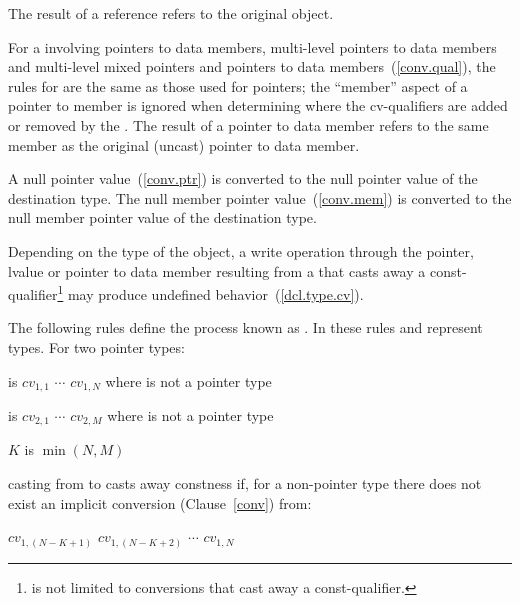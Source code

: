 The result of a reference  refers
to the original object.

\pnum
For a  involving pointers to data members, multi-level
pointers to data members and multi-level mixed pointers and pointers to
data members~(\ref{conv.qual}), the rules for  are the
same as those used for pointers; the ``member'' aspect of a pointer to
member is ignored when determining where the cv-qualifiers are added or
removed by the . The result of a pointer to data
member  refers to the same member as the original
(uncast) pointer to data member.

\pnum
A null pointer value~(\ref{conv.ptr}) is converted to the null pointer
value of the destination type. The null member pointer
value~(\ref{conv.mem}) is converted to the null member pointer value of
the destination type.

\pnum
\enternote 
Depending on the type of the object, a write operation through the
pointer, lvalue or pointer to data member resulting from a
 that casts away a const-qualifier\footnote{
is not limited to conversions that cast away a
const-qualifier.}
may produce undefined behavior~(\ref{dcl.type.cv}).
\exitnote 

\pnum
The following rules define the process known as . In these rules  and 
represent types. For two pointer types:

\begin{indented}
 is $\mathit{cv}_{1,1}$ \tcode{*} $\cdots$
$\mathit{cv}_{1,N}$ \tcode{*} where  is not a pointer type
\end{indented}

\begin{indented}
 is $\mathit{cv}_{2,1}$ \tcode{*} $\cdots$
$\mathit{cv}_{2,M}$ \tcode{*} where  is not a pointer type
\end{indented}

\begin{indented}
$K$ is $\min (N,M)$
\end{indented}

casting from  to  casts away constness if, for a
non-pointer type  there does not exist an implicit conversion
(Clause~\ref{conv}) from:

\begin{indented}
$\mathit{cv}_{1,(N-K+1)}$ \tcode{*} $\mathit{cv}_{1,(N-K+2)}$
\tcode{*} $\cdots$ $\mathit{cv}_{1,N}$ \tcode{*}
\end{indented}

